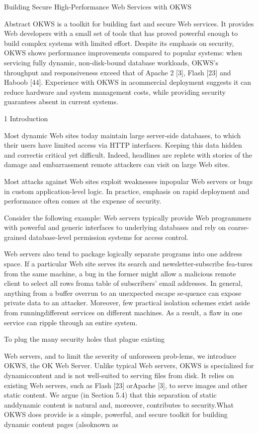 Building Secure High-Performance Web Services with OKWS

Abstract
OKWS is a toolkit for building fast and secure Web services. 
It provides Web developers with a small set of tools that has proved powerful
enough to build complex systems with limited effort. 
Despite its emphasis on security, OKWS shows performance improvements compared
to popular systems: when servicing fully dynamic, non-disk-bound database
workloads, OKWS's throughput and responsiveness exceed that of Apache 2 [3],
Flash [23] and Haboob [44]. 
Experience with OKWS in acommercial deployment suggests it can reduce hardware
and system management costs, while providing security guarantees absent in
current systems.

1 Introduction

Most dynamic Web sites today maintain large server-side databases, to which
their users have limited access via HTTP interfaces. 
Keeping this data hidden and correctis critical yet difficult. 
Indeed, headlines are replete with stories of the damage and embarrassment
remote attackers can visit on large Web sites.

Most attacks against Web sites exploit weaknesses inpopular Web servers or bugs
in custom application-level logic. 
In practice, emphasis on rapid deployment and performance often comes at the
expense of security.

Consider the following example: Web servers typically provide Web programmers
with powerful and generic interfaces to underlying databases and rely on
coarse-grained database-level permission systems for access control. 

Web servers also tend to package logically separate programs into one address
space.
If a particular Web site serves its search and newsletter-subscribe fea-tures from the same machine, a bug in the former might allow a malicious remote client to select all rows froma table of subscribers' email addresses. In general, anything from a buffer overrun to an unexpected escape se-quence can expose private data to an attacker. Moreover,
few practical isolation schemes exist aside from runningdifferent services on different machines. As a result, a
flaw in one service can ripple through an entire system.

To plug the many security holes that plague existing

Web servers, and to limit the severity of unforeseen prob-lems, we introduce OKWS, the OK Web Server. Unlike
typical Web servers, OKWS is specialized for dynamiccontent and is not well-suited to serving files from disk.
It relies on existing Web servers, such as Flash [23] orApache [3], to serve images and other static content. We
argue (in Section 5.4) that this separation of static anddynamic content is natural and, moreover, contributes to
security.What OKWS does provide is a simple, powerful, and
secure toolkit for building dynamic content pages (alsoknown as

